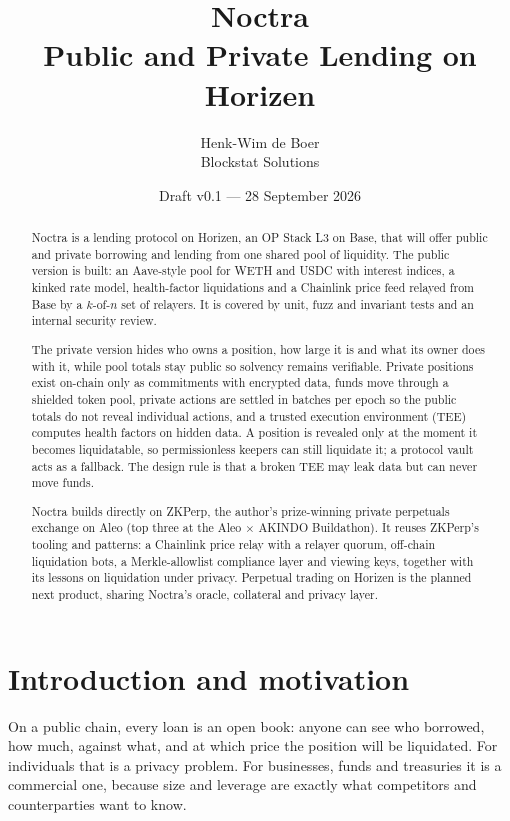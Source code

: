 \documentclass[11pt,a4paper]{article}
\title{\textbf{Noctra}\\[4pt]\large Public and Private Lending on Horizen}
\author{Henk-Wim de Boer\\Blockstat Solutions}
\date{Draft v0.1 --- 28 September 2026}
\begin{document}
\maketitle

\begin{abstract}
\noindent Noctra is a lending protocol on Horizen, an OP Stack L3 on Base, that will offer public and private
borrowing and lending from one shared pool of liquidity. The public version is built: an Aave-style pool for
WETH and USDC with interest indices, a kinked rate model, health-factor liquidations and a Chainlink price feed
relayed from Base by a $k$-of-$n$ set of relayers. It is covered by unit, fuzz and invariant tests and an
internal security review.

The private version hides who owns a position, how large it is and what its owner does with it, while pool
totals stay public so solvency remains verifiable. Private positions exist on-chain only as commitments with
encrypted data, funds move through a shielded token pool, private actions are settled in batches per epoch so
the public totals do not reveal individual actions, and a trusted execution environment (TEE) computes health
factors on hidden data. A position is revealed only at the moment it becomes liquidatable, so
permissionless keepers can still liquidate it; a protocol vault acts as a fallback. The design rule is that a
broken TEE may leak data but can never move funds.

Noctra builds directly on ZKPerp, the author's prize-winning private perpetuals exchange on Aleo (top three at
the Aleo $\times$ AKINDO Buildathon). It reuses ZKPerp's tooling and patterns: a Chainlink price relay with a
relayer quorum, off-chain liquidation bots, a Merkle-allowlist compliance layer and viewing keys, together with
its lessons on liquidation under privacy. Perpetual trading on Horizen is the planned next product,
sharing Noctra's oracle, collateral and privacy layer.
\end{abstract}

\tableofcontents
\newpage

\section{Introduction and motivation}

On a public chain, every loan is an open book: anyone can see who borrowed, how much, against what, and at
which price the position will be liquidated. For individuals that is a privacy problem. For businesses, funds
and treasuries it is a commercial one, because size and leverage are exactly what competitors and
counterparties want to know.
\end{document}
